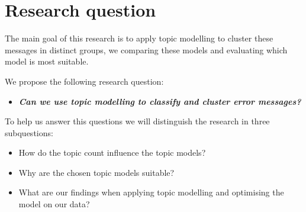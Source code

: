 \begin{comment}

Topic modelling is a hot topic in data science. System logs are used as source for the detection of problems in large computer systems. While domain experts can be used to detect and fix the problems detected, this can be difficult and time consuming. Machine learning techniques like topic modelling make it possible to develop models to extract these latent patterns from these system logs. While topic modelling is normally used in for large text corpera, recent research in the field of short text clustering and twitter tweets clustering are similar enough to by applicable for system logs. An interesting application which has not yet been touched a lot through unsupervised machine learning techniques.

\end{comment}


\section{Research question}\label{introduction:Researchquestion}
The main goal of this research is to apply topic modelling to cluster these messages in distinct groups, we comparing these models and evaluating which model is most suitable.

\noindent We propose the following research question: 
\begin{itemize}
    \item \textbf{\textit{Can we use topic modelling to classify and cluster error messages?}}
\end{itemize}

\noindent To help us answer this questions we will distinguish the research in three subquestions:
\begin{itemize}
    \item How do the topic count influence the topic models?
    \item Why are the chosen topic models suitable?
    \item What are our findings when applying topic modelling and optimising the model on our data?
\end{itemize}

\begin{comment}
What are the optimal parameters?

What are the pro's and con's of using LDA?

subquestions:
Why is LDA suitable for this type of data 

How do the parameters influence the models performance?

What are the pro's and con's of using LDA?

What other methods are available to solve this error clustering?


\end{comment}


